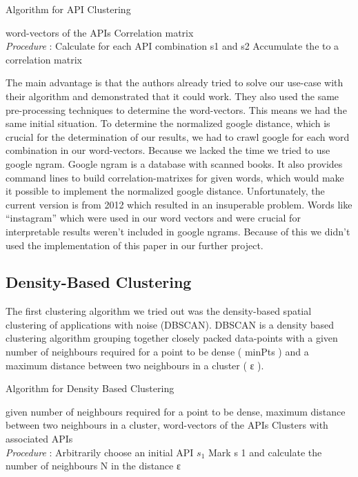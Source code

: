 \documentclass[a4paper]{IEEEtran}
\begin{document}
\begin{algorithm}[H]
 \caption{Algorithm for API Clustering}
 \begin{algorithmic}[1]
\renewcommand{\algorithmicrequire}{\textbf{Input:}}
 \renewcommand{\algorithmicensure}{\textbf{Output:}}
 \REQUIRE word-vectors of the APIs
 \ENSURE  Correlation matrix
 \\ \textit{Procedure} :
  \STATE Calculate for each API combination s1 and s2
 \STATE Accumulate the to a correlation matrix
 \end{algorithmic}
 \end{algorithm}

The main advantage is that the authors already tried to solve our use-case with their algorithm and demonstrated that it could work. They also used the same pre-processing techniques to determine the word-vectors. This means we had the same initial situation.
To determine the normalized google distance, which is crucial for the determination of our results, we had to crawl google for each word combination in our word-vectors. Because we lacked the time we tried to use google ngram. Google ngram is a database with scanned books. It also provides command lines to build correlation-matrixes for given words, which would make it possible to implement the normalized google distance. Unfortunately, the current version is from 2012 which resulted in an insuperable problem. Words like “instagram” which were used in our word vectors and were crucial for interpretable results weren’t included in google ngrams. Because of this we didn’t used the implementation of this paper in our further project.

\subsection{Density-Based Clustering}
The first clustering algorithm we tried out was the density-based spatial clustering of applications with noise (DBSCAN). DBSCAN is a density based clustering algorithm grouping together closely packed data-points with a given number of neighbours required for a point to be dense ( minPts ) and a maximum distance between two neighbours in a cluster ( ε ). 

\begin{algorithm}[H]
 \caption{Algorithm for Density Based Clustering}
 \begin{algorithmic}[1]
\renewcommand{\algorithmicrequire}{\textbf{Input:}}
 \renewcommand{\algorithmicensure}{\textbf{Output:}}
 \REQUIRE given number of neighbours required for a point to be dense, maximum distance between two
neighbours in a cluster, word-vectors of the APIs
 \ENSURE  Clusters with associated APIs
 \\ \textit{Procedure} :
  \STATE Arbitrarily choose an initial API $s_1$
 \STATE Mark s 1 and calculate the number of neighbours N in the distance ε
 \end{algorithmic}
 \end{algorithm}
\end{document}
